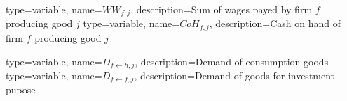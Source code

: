{%
  type=variable,%
  name={$WW_{f,j}$},%
  description={Sum of wages payed by firm $f$ producing good $j$} 
}
{%
  type=variable,%
  name={$CoH_{f,j}$},%
  description={Cash on hand of firm $f$ producing good $j$} 
}

{%
  type=variable,%
  name={$D_{f\leftarrow h,j}$},%
  description={Demand of consumption goods} 
}
{%
  type=variable,%
  name={$D_{f\leftarrow f,j}$},%
  description={Demand of goods for investment pupose} 
}
